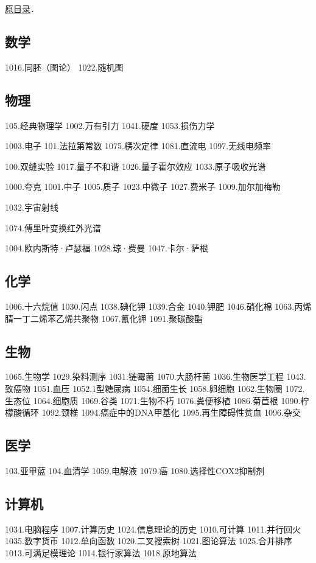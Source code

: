 
\begin{issues}
\issueDraft
\end{issues}

\href{https://wuli.wiki/assets/sogou}{原目录}．

\subsection{数学}

1016.同胚（图论）
1022.随机图

\subsection{物理}

105.经典物理学
1002.万有引力
1041.硬度
1053.损伤力学

1003.电子
101.法拉第常数
1075.楞次定律
1081.直流电
1097.无线电频率

100.双缝实验
1017.量子不和谐
1026.量子霍尔效应
1033.原子吸收光谱

1000.夸克
1001.中子
1005.质子
1023.中微子
1027.费米子
1009.加尔加梅勒

1032.宇宙射线

1074.傅里叶变换红外光谱

1004.欧内斯特·卢瑟福
1028.琼·费曼
1047.卡尔·萨根

\subsection{化学}
1006.十六烷值
1030.闪点
1038.碘化钾
1039.合金
1040.钾肥
1046.硝化棉
1063.丙烯腈一丁二烯苯乙烯共聚物
1067.氰化钾
1091.聚碳酸酯

\subsection{生物}
1065.生物学
1029.染料测序
1031.链霉菌
1070.大肠杆菌
1036.生物医学工程
1043.致癌物
1051.血压
1052.1型糖尿病
1054.细菌生长
1058.卵细胞
1062.生物圈
1072.生态位
1064.细胞质
1069.谷类
1071.生物不朽
1076.粪便移植
1086.菊苣根
1090.柠檬酸循环
1092.颈椎
1094.癌症中的DNA甲基化
1095.再生障碍性贫血
1096.杂交

\subsection{医学}
103.亚甲蓝
104.血清学
1059.电解液
1079.癌
1080.选择性COX2抑制剂

\subsection{计算机}
1034.电脑程序
1007.计算历史
1024.信息理论的历史
1010.可计算
1011.并行回火
1035.数字货币
1012.单向函数
1020.二叉搜索树
1021.图论算法
1025.合并排序
1013.可满足模理论
1014.银行家算法
1018.原地算法

